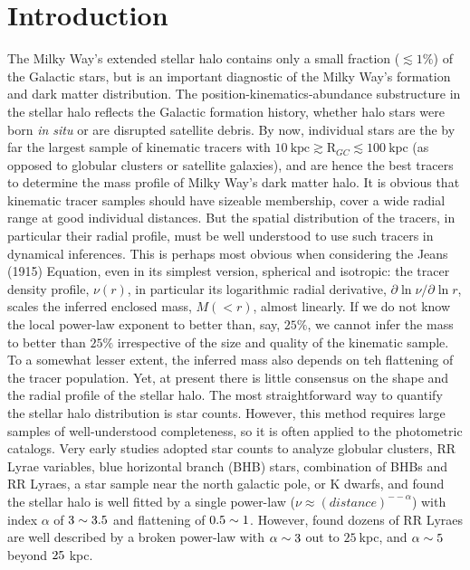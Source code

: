 \documentclass[12pt,preprint]{aastex}
\newcommand{\rgc}{\ensuremath{\mathrm{R}_{GC}}}
\begin{document}
\section{Introduction}
The Milky Way's extended stellar halo contains only a small fraction ($\lesssim 1\%$) of the Galactic stars, but is an important diagnostic of the Milky Way's formation and dark matter distribution. The position-kinematics-abundance substructure in the stellar halo reflects the Galactic formation history, whether halo stars were born \textit{in situ} or are disrupted satellite debris. By now, individual stars are the by far the largest sample of
kinematic tracers with
$10~\mathrm{kpc}\gtrsim \rgc\lesssim 100~\mathrm{kpc}$ (as opposed to globular clusters or satellite galaxies), and are hence the best tracers to determine the mass profile of Milky Way's dark matter halo. It is obvious that kinematic tracer samples should have sizeable membership, cover a wide radial range at good individual distances. But the spatial distribution of the tracers, in particular their radial profile, must be well understood to use such tracers in dynamical inferences. This is perhaps most obvious when considering the Jeans (1915) Equation, even in its simplest version, spherical and isotropic: the tracer
density profile, $\nu (r)$, in particular its logarithmic radial derivative,
$\partial{\ln \nu}/\partial{\ln r}$, scales the inferred enclosed mass, $M(<r)$, almost linearly.
If we do not know the local power-law exponent to better than, say, $25\%$, we cannot
infer the mass to better than $25\%$ irrespective of the size and quality of the kinematic sample. To a somewhat lesser extent, the inferred mass also depends on teh flattening of the tracer population. Yet, at present there is little consensus on the shape and the radial profile of the stellar halo.
The most straightforward way to quantify the stellar halo distribution is star counts. However, this method requires large samples of well-understood completeness, so it is often applied to the photometric catalogs. Very early studies adopted star counts to analyze globular clusters\citep{Harris1976}, RR Lyrae variables\citep{Hawkins1984,Wetterer1996}, blue horizontal branch (BHB) stars\citep{Sommer-Larsen1987}, combination of BHBs and RR Lyraes\citep{Sluis1998}, a star sample near the north galactic pole\citep{Soubiran1993}, or K dwarfs\citep{Gould1998}, and found the stellar halo is well fitted by a single power-law ($\nu \approx (distance)^{−-\alpha}$) with index $\alpha$ of $\rm 3\sim3.5$ and flattening of $\rm 0.5\sim1$. However, \citet{Saha1985} found dozens of RR Lyraes are well described by a broken power-law with $\rm \alpha \sim 3$ out to $25~$kpc, and $\rm \alpha \sim 5$ beyond $\rm 25~$kpc.
\end{document}
